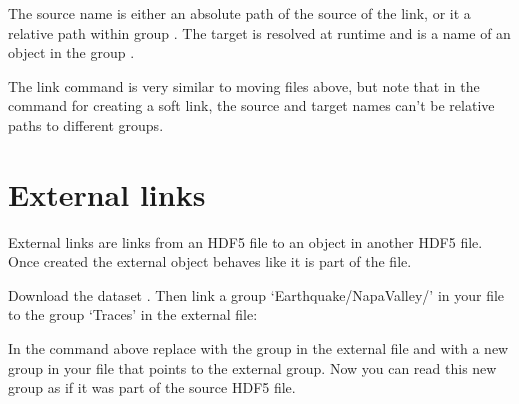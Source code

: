 \documentclass[letterpaper,10pt,english]{sphinxmanual}
\begin{document}
\begin{sphinxVerbatim}[commandchars=\\\{\}]
    
\end{sphinxVerbatim}

\sphinxAtStartPar
The source name is either an absolute path of the source of the link, or it a relative path within group .
The target is resolved at runtime and is a name of an object in the group .

\sphinxAtStartPar
The link command is very similar to moving files above, but note that in the command for creating a soft link,
the source and target names can’t be relative paths to different groups.


\chapter{External links}
\label{\detokenize{index:external-links}}
\sphinxAtStartPar
External links are links from an HDF5 file to an object in another HDF5 file.
Once created the external object behaves like it is part of the file.

\sphinxAtStartPar
Download the dataset .
Then link a group ‘Earthquake/NapaValley/’ in your file to the group ‘Traces’ in the external file:

\begin{sphinxVerbatim}[commandchars=\\\{\}]
     
\end{sphinxVerbatim}

\sphinxAtStartPar
In the command above replace  with the group in the external file and 
with a new group in your file that points to the external group.
Now you can read this new group as if it was part of the source HDF5 file.
\end{document}
